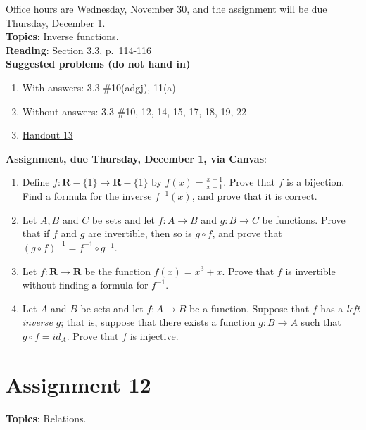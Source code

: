 \documentclass[12pt]{article}
\begin{document}
\noindent Office hours are Wednesday, November 30, and the assignment will be due Thursday, December 1.
\\

\noindent \textbf{Topics}: Inverse functions.
\\

\noindent \textbf{Reading}: Section 3.3, p.~114-116
\\

\noindent \textbf{Suggested problems (do not hand in)}

\begin{enumerate}
\item With answers: 3.3 \#10(adgj), 11(a)
\item Without answers: 3.3 \#10, 12, 14, 15, 17, 18, 19, 22
\item \href{https://www.math.emory.edu/~dzb/teaching/250Fall2021/handouts/250-H13-inverses.pdf}{Handout 13}
\end{enumerate}

\noindent \textbf{Assignment, due Thursday, December 1, via Canvas}:
\begin{enumerate}
\item Define $f \colon \mathbf{R}-\{1\} \to \mathbf{R} - \{1\}$ by $f(x) = \frac{x+1}{x-1}$. Prove that $f$ is a bijection. Find a formula for the inverse $f^{-1}(x)$, and prove that it is correct.
\item Let $A, B$ and $C$ be sets and let $f \colon A \to B$ and $g \colon B \to C$ be functions. Prove that if $f$ and $g$ are invertible, then so is $g \circ f$, and prove that $(g \circ f)^{-1} = f^{-1} \circ g^{-1}$.
\item Let $f \colon \mathbf{R} \to \mathbf{R}$ be the function $f(x) = x^3 + x$. Prove that $f$ is invertible without finding a formula for $f^{-1}$.
\item Let $A$ and $B$ be sets and let $f \colon A \to B$ be a function. Suppose that $f$ has a \emph{left inverse} $g$; that is, suppose that there exists a function $g \colon B \to A$ such that $g \circ f = id_A$. Prove that $f$ is injective.
\end{enumerate}


\newpage
\section[12 (due December 6): Relations]{Assignment 12}

\textbf{Topics}: Relations.
\\
\end{document}
